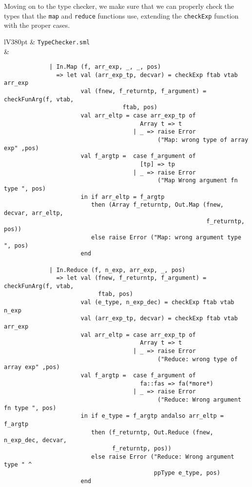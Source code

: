 \documentclass[a4paper]{article}
\begin{document}
Moving on to the type checker, we make sure that we can properly check the types that the \verb|map| and \verb|reduce| functions use, extending the \verb|checkExp| function with the proper cases.

\begin{center}	
	\begin{tabular}{lV{380pt}}
		\toprule
		& \verb|TypeChecker.sml|\\
		\midrule
		&
		\begin{verbatim}
			 | In.Map (f, arr_exp, _, _, pos)
			   => let val (arr_exp_tp, decvar) = checkExp ftab vtab arr_exp
			          val (fnew, f_returntp, f_argument) = checkFunArg(f, vtab, 
			                      ftab, pos)
			          val arr_eltp = case arr_exp_tp of
			                           Array t => t
			                         | _ => raise Error
			                                ("Map: wrong type of array exp" ,pos)
			          val f_argtp =  case f_argument of
			                           [tp] => tp
			                         | _ => raise Error 
			                                ("Map Wrong argument fn type ", pos)
			          in if arr_eltp = f_argtp
			             then (Array f_returntp, Out.Map (fnew, decvar, arr_eltp, 
			                                              f_returntp, pos))
			             else raise Error ("Map: wrong argument type ", pos)
			          end
			 
			 | In.Reduce (f, n_exp, arr_exp, _, pos)
			   => let val (fnew, f_returntp, f_argument) = checkFunArg(f, vtab, 
			               ftab, pos)
			          val (e_type, n_exp_dec) = checkExp ftab vtab n_exp
			          val (arr_exp_tp, decvar) = checkExp ftab vtab arr_exp
			          val arr_eltp = case arr_exp_tp of
			                           Array t => t
			                         | _ => raise Error 
			                                ("Reduce: wrong type of array exp" ,pos)
			          val f_argtp =  case f_argument of
			                           fa::fas => fa(*more*)
			                         | _ => raise Error 
			                                ("Reduce: Wrong argument fn type ", pos)
			          in if e_type = f_argtp andalso arr_eltp = f_argtp
			             then (f_returntp, Out.Reduce (fnew, n_exp_dec, decvar, 
			                   f_returntp, pos))
			             else raise Error ("Reduce: Wrong argument type " ^ 
			                               ppType e_type, pos)
			          end
		\end{verbatim}
		\\
		\bottomrule \\
	\end{tabular}
\end{center}
	
\end{document}
